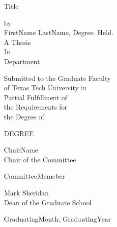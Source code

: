 \begin{titlepage}
   \begin{center}
        \begin{singlespace}
        Title \\
        \end{singlespace}
        \vspace{0.75cm}
        by\\
        \vspace{0.5cm}
        FirstName LastName, Degree. Held.\\
        \vspace{0.5cm}
        A Thesis\\
        \vspace{0.5cm}
        In\\
        \vspace{0.5cm}
        Department\\
        \vspace{0.5cm}
        \begin{singlespace}
        Submitted to the Graduate Faculty\\
        of Texas Tech University in\\
        Partial Fulfillment of\\
        the Requirements for\\
        the Degree of\\
        \end{singlespace}
        \vspace{0.5cm}
        DEGREE\\
        \vspace{1cm}
        \begin{singlespace}
        ChairName\\
        Chair of the Committee\\
        \end{singlespace}
        \vspace{1cm}
        CommitteeMemeber\\
        \vspace{1cm}
        \begin{singlespace}
        Mark Sheridan\\
        Dean of the Graduate School\\
        \end{singlespace}
        \vspace{2cm}
        GraduatingMonth, GraduatingYear
   \end{center}
\newpage
\end{titlepage}
